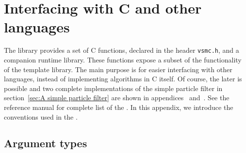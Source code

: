 \chapter{Interfacing with C and other languages}
\label{app:chap:Interfacing with C and other languages}

The library provides a set of C functions, declared in the header
\verb|vsmc.h|, and a companion runtime library. These functions expose a subset
of the functionality of the \cpp template library. The main purpose is for
easier interfacing with other languages, instead of implementing algorithms in
C itself. Of course, the later is possible and two complete \cnn
implementations of the simple particle filter in section~\ref{sec:A simple
  particle filter} are shown in appendices~ and~. See the reference manual for complete list of the \api. In this
appendix, we introduce the conventions used in the \api.

\section{Argument types}
\label{app:sec:Argument types}

